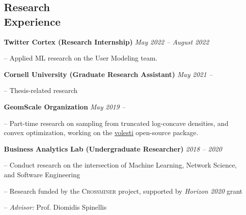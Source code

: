 \documentclass[margin]{res}
\begin{document}
\begin{resume}
%
%
%

\section{Research \\ Experience}

\textbf{Twitter Cortex (Research Internship)} \hfill \emph{May 2022 -- August 2022}
\begin{compactitem}
\item[--] Applied ML research on the User Modeling team.	
\end{compactitem}

\textbf{Cornell University (Graduate Research Assistant)} \hfill \emph{May 2021 --}
\begin{compactitem}
	\item[--] Thesis-related research
\end{compactitem}


\textbf{GeomScale Organization} \hfill \emph{May 2019 --}

\begin{compactitem}
	\item[--] Part-time research on sampling from truncated log-concave densities, and convex optimization, working on the \href{https://github.com/GeomScale/volesti}{volesti} open-source package.
\end{compactitem}



\textbf{Business Analytics Lab (Undergraduate Researcher)} \hfill \emph{2018 -- 2020}
\begin{compactitem}
\item[--] Conduct research on the intersection of Machine Learning, Network Science, and Software Engineering 
\item[--] Research funded by the \textsc{Crossminer} project, supported by \emph{Horizon 2020} grant
\item[--] \emph{Advisor:} Prof. Diomidis Spinellis
\end{compactitem}


\end{resume}
\end{document}
